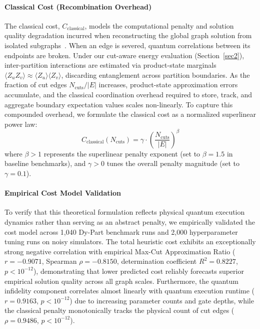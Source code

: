 \documentclass[pdflatex,sn-mathphys-num]{sn-jnl}
\theoremstyle{thmstyleone}
\theoremstyle{thmstyletwo}%
\theoremstyle{thmstylethree}%
\begin{document}
\paragraph{Classical Cost (Recombination Overhead)} The classical cost, $C_{\text{classical}}$, models the computational penalty and solution quality degradation incurred when reconstructing the global graph solution from isolated subgraphs~\cite{Bhatotia2024QuantumClassicalCVH}. When an edge is severed, quantum correlations between its endpoints are broken. Under our cut-aware energy evaluation (Section~\ref{sec2}), inter-partition interactions are estimated via product-state marginals $\langle Z_u Z_v \rangle \approx \langle Z_u \rangle \langle Z_v \rangle$, discarding entanglement across partition boundaries. As the fraction of cut edges $N_{\text{cuts}} / |E|$ increases, product-state approximation errors accumulate, and the classical coordination overhead required to store, track, and aggregate boundary expectation values scales non-linearly. To capture this compounded overhead, we formulate the classical cost as a normalized superlinear power law:
\begin{equation}
    C_{\text{classical}}(N_{\text{cuts}}) = \gamma \cdot \left(\frac{N_{\text{cuts}}}{|E|}\right)^\beta
    \label{eq:classical_cost}
\end{equation}
where $\beta > 1$ represents the superlinear penalty exponent (set to $\beta = 1.5$ in baseline benchmarks), and $\gamma > 0$ tunes the overall penalty magnitude (set to $\gamma = 0.1$).

\paragraph{Empirical Cost Model Validation} To verify that this theoretical formulation reflects physical quantum execution dynamics rather than serving as an abstract penalty, we empirically validated the cost model across 1,040 Dy-Part benchmark runs and 2,000 hyperparameter tuning runs on noisy simulators. The total heuristic cost exhibits an exceptionally strong negative correlation with empirical Max-Cut Approximation Ratio ($r = -0.9071$, Spearman $\rho = -0.8150$, determination coefficient $R^2 = 0.8227$, $p < 10^{-12}$), demonstrating that lower predicted cost reliably forecasts superior empirical solution quality across all graph scales. Furthermore, the quantum infidelity component correlates almost linearly with quantum execution runtime ($r = 0.9163$, $p < 10^{-12}$) due to increasing parameter counts and gate depths, while the classical penalty monotonically tracks the physical count of cut edges ($\rho = 0.9486$, $p < 10^{-12}$).
\end{document}
